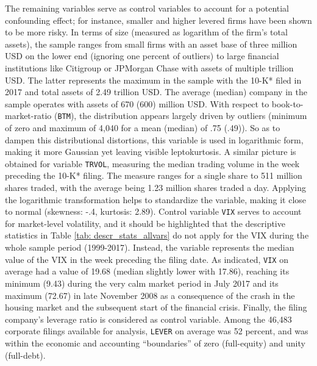 The remaining variables serve as control variables to account for a potential confounding effect; for instance, smaller and higher levered firms have been shown to be more risky. In terms of size (measured as logarithm of the firm's total assets), the sample ranges from small firms with an asset base of three million USD on the lower end (ignoring one percent of outliers) to large financial institutions like Citigroup or JPMorgan Chase with assets of multiple trillion USD. The latter represents the maximum in the sample with the 10-K* filed in 2017 and total assets of 2.49 trillion USD. The average (median) company in the sample operates with assets of 670 (600) million USD. With respect to book-to-market-ratio (\texttt{BTM}), the distribution appears largely driven by outliers (minimum of zero and maximum of 4,040 for a mean (median) of .75 (.49)). So as to dampen this distributional distortions, this variable is used in logarithmic form, making it more Gaussian yet leaving visible leptokurtosis. A similar picture is obtained for variable \texttt{TRVOL}, measuring the median trading volume in the week preceding the 10-K* filing. The measure ranges for a single share to 511 million shares traded, with the average being 1.23 million shares traded a day. Applying the logarithmic transformation helps to standardize the variable, making it close to normal (skewness: -.4, kurtosis: 2.89). Control variable \texttt{VIX} serves to account for market-level volatility, and it should be highlighted that the descriptive statistics in Table \ref{tab: descr_stats_allvars} do not apply for the VIX during the whole sample period (1999-2017). Instead, the variable represents the median value of the VIX in the week preceding the filing date. As indicated, \texttt{VIX} on average had a value of 19.68 (median slightly lower with 17.86), reaching its minimum (9.43) during the very calm market period in July 2017 and its maximum (72.67) in late November 2008 as a consequence of the crash in the housing market and the subsequent start of the financial crisis. Finally, the filing company's leverage ratio is considered as control variable. Among the 46,483 corporate filings available for analysis, \texttt{LEVER} on average was 52 percent, and was within the economic and accounting \enquote{boundaries} of zero (full-equity) and unity (full-debt). 

\clearpage